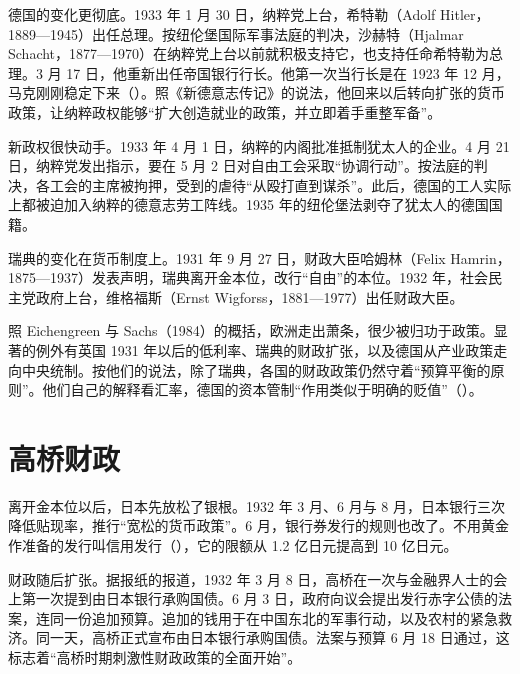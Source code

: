 德国的变化更彻底。1933 年 1 月 30 日，纳粹党上台，希特勒（Adolf Hitler，1889—1945）出任总理\cite{nca1947,loc30}。按纽伦堡国际军事法庭的判决，沙赫特（Hjalmar Schacht，1877—1970）在纳粹党上台以前就积极支持它，也支持任命希特勒为总理\cite{nca1947}。3 月 17 日，他重新出任帝国银行行长\cite{nca1947,schacht2005}。他第一次当行长是在 1923 年 12 月，马克刚刚稳定下来（）。照《新德意志传记》的说法，他回来以后转向扩张的货币政策，让纳粹政权能够“扩大创造就业的政策，并立即着手重整军备”\cite{schacht2005}。

新政权很快动手。1933 年 4 月 1 日，纳粹的内阁批准抵制犹太人的企业\cite{nca1947}。4 月 21 日，纳粹党发出指示，要在 5 月 2 日对自由工会采取“协调行动”\cite{nca1947}。按法庭的判决，各工会的主席被拘押，受到的虐待“从殴打直到谋杀”\cite{nca1947}。此后，德国的工人实际上都被迫加入纳粹的德意志劳工阵线\cite{nca1947}。1935 年的纽伦堡法剥夺了犹太人的德国国籍\cite{nca1947}。

瑞典的变化在货币制度上。1931 年 9 月 27 日，财政大臣哈姆林（Felix Hamrin，1875—1937）发表声明，瑞典离开金本位，改行“自由”的本位\cite{berg1998,loc30}。1932 年，社会民主党政府上台，维格福斯（Ernst Wigforss，1881—1977）出任财政大臣\cite{berg1998,loc30}。

照 Eichengreen 与 Sachs（1984）的概括，欧洲走出萧条，很少被归功于政策\cite{eichengreen1984}。显著的例外有英国 1931 年以后的低利率、瑞典的财政扩张，以及德国从产业政策走向中央统制\cite{eichengreen1984}。按他们的说法，除了瑞典，各国的财政政策仍然守着“预算平衡的原则”\cite{eichengreen1984}。他们自己的解释看汇率，德国的资本管制“作用类似于明确的贬值”（）\cite{eichengreen1984}。

\section{高桥财政}\label{sec:alternatives-japan}

离开金本位以后，日本先放松了银根。1932 年 3 月、6 月与 8 月，日本银行三次降低贴现率，推行“宽松的货币政策”\cite{shizume2009}。6 月，银行券发行的规则也改了\cite{shizume2009}。不用黄金作准备的发行叫信用发行（），它的限额从 1.2 亿日元提高到 10 亿日元\cite{shizume2009}。

财政随后扩张。据报纸的报道，1932 年 3 月 8 日，高桥在一次与金融界人士的会上第一次提到由日本银行承购国债\cite{shizume2009}。6 月 3 日，政府向议会提出发行赤字公债的法案，连同一份追加预算\cite{shizume2009}。追加的钱用于在中国东北的军事行动，以及农村的紧急救济\cite{shizume2009}。同一天，高桥正式宣布由日本银行承购国债\cite{shizume2009}。法案与预算 6 月 18 日通过，这标志着“高桥时期刺激性财政政策的全面开始”\cite{shizume2009}。

